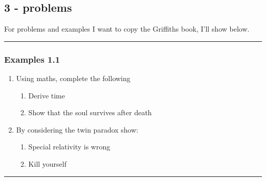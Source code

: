 \documentclass[11pt,oneside]{book}
\begin{document}
\subsection{3 - problems}
For problems and examples I want to copy the Griffiths book, I'll show below.\\
%
\noindent\rule[0.2ex]{\linewidth}{0.1cm}
\subsubsection{Examples 1.1}
\begin{adjustwidth}{1cm}{1cm}
	\begin{enumerate}
		\item Using maths, complete the following
		\begin{enumerate}
			\item Derive time
			\item Show that the soul survives after death
		\end{enumerate}
		\item By considering the twin paradox show:
		\begin{enumerate}
			\item Special relativity is wrong
			\item Kill yourself
		\end{enumerate}
	\end{enumerate}
\end{adjustwidth}
\noindent\rule[0.5ex]{\linewidth}{0.1cm}
%
\end{document}
